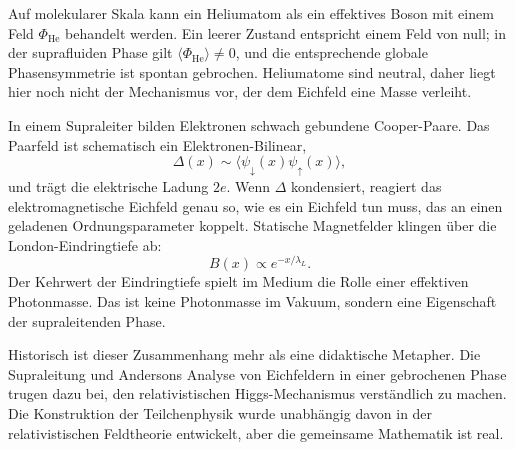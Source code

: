 Auf molekularer Skala kann ein Heliumatom als ein effektives Boson mit einem Feld \(\Phi_{\mathrm{He}}\) behandelt werden. Ein leerer Zustand entspricht einem Feld von null; in der suprafluiden Phase gilt \(\langle\Phi_{\mathrm{He}}\rangle\ne0\), und die entsprechende globale Phasensymmetrie ist spontan gebrochen. Heliumatome sind neutral, daher liegt hier noch nicht der Mechanismus vor, der dem Eichfeld eine Masse verleiht.

In einem Supraleiter bilden Elektronen schwach gebundene Cooper-Paare. Das Paarfeld ist schematisch ein Elektronen-Bilinear,
\begin{equation}
  \Delta(x)\sim\langle\psi_\downarrow(x)\psi_\uparrow(x)\rangle,
  \label{eq:l10-cooper-order-parameter}
\end{equation}
und trägt die elektrische Ladung \(2e\). Wenn \(\Delta\) kondensiert, reagiert das elektromagnetische Eichfeld genau so, wie es ein Eichfeld tun muss, das an einen geladenen Ordnungsparameter koppelt. Statische Magnetfelder klingen über die London-Eindringtiefe ab:
\begin{equation}
  B(x)\propto e^{-x/\lambda_L}.
  \label{eq:l10-meissner-screening}
\end{equation}
Der Kehrwert der Eindringtiefe spielt im Medium die Rolle einer effektiven Photonmasse. Das ist keine Photonmasse im Vakuum, sondern eine Eigenschaft der supraleitenden Phase.

\begin{classroomqa}
\end{classroomqa}

Historisch ist dieser Zusammenhang mehr als eine didaktische Metapher. Die Supraleitung und Andersons Analyse von Eichfeldern in einer gebrochenen Phase trugen dazu bei, den relativistischen Higgs-Mechanismus verständlich zu machen. Die Konstruktion der Teilchenphysik wurde unabhängig davon in der relativistischen Feldtheorie entwickelt, aber die gemeinsame Mathematik ist real.

